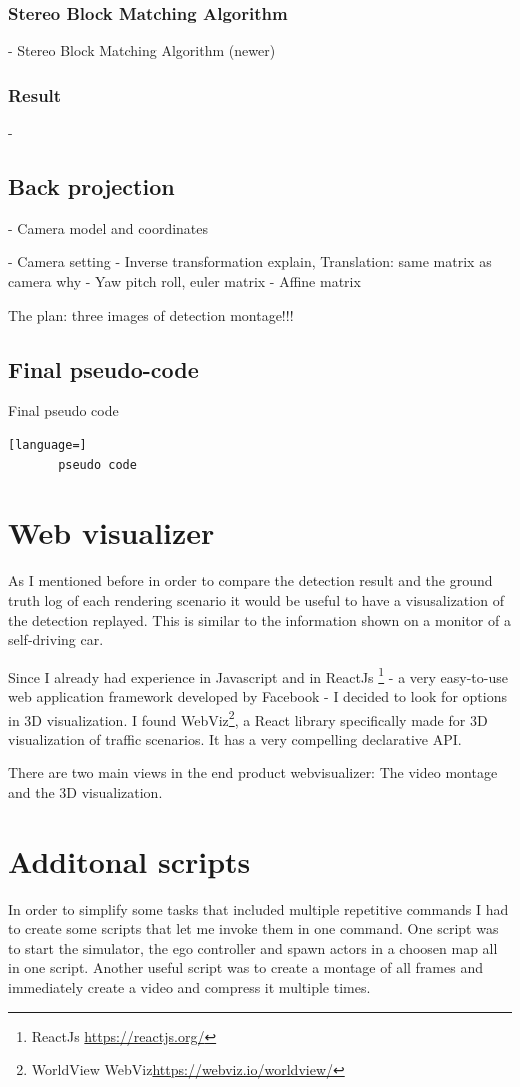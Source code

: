 \subsubsection{Stereo Block Matching Algorithm}
- Stereo Block Matching Algorithm (newer)
\subsubsection{Result}
- 
\subsection{Back projection}
- Camera model and coordinates

- Camera setting
- Inverse transformation explain, Translation: same matrix as camera why
- Yaw pitch roll, euler matrix
- Affine matrix

The plan: 
three images of detection montage!!!


\subsection{Final pseudo-code}
Final pseudo code
\begin{lstlisting}[language=]
       pseudo code
    \end{lstlisting}

\section{Web visualizer}
As I mentioned before in order to compare the detection result and the ground
truth log of each rendering scenario it would be useful to have a visusalization
of the detection replayed. This is similar to the information shown on a monitor
of a self-driving car.

Since I already had experience in Javascript and in ReactJs \footnote{ReactJs
\url{https://reactjs.org/}} - a very easy-to-use web application framework
developed by Facebook - I decided to look for options in 3D visualization. I
found WebViz\footnote{WorldView WebViz\url{https://webviz.io/worldview/}}, a
React library specifically made for 3D visualization of traffic scenarios. It
has a very compelling declarative API.

There are two main views in the end product webvisualizer: The video montage and
the 3D visualization.

\section{Additonal scripts}

In order to simplify some tasks that included multiple repetitive commands I had
to create some scripts that let me invoke them in one command. One script was to
start the simulator, the ego controller and spawn actors in a choosen map all in
one script. Another useful script was to create a montage of all frames and
immediately create a video and compress it multiple times.
